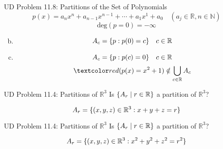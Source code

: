 \begin{frame}{}
  \begin{exampleblock}{UD Problem 11.8: Partitions of the Set of Polynomials}
    \[
      p(x) = a_n x^n + a_{n-1} x^{n-1} + \cdots + a_1 x^1 + a_0 \quad (a_j \in \mathbb{R}, n \in \mathbb{N})
    \]
    \[
      \text{deg}(p = 0) = -\infty
    \]

    \begin{enumerate}[(a)]
      \setcounter{enumi}{1}
      \item 
	\[
	  A_c = \{p: p(0) = c\} \quad c \in \mathbb{R}
	\]
      \setcounter{enumi}{3}
      \item 
	\pause
	\[
	  A_c = \{p: p(c) = 0\} \quad c \in \mathbb{R}
	\]
	\pause
	\vspace{-0.20cm}
	\[
	  \red{(p(x) = x^2 + 1) \notin \bigcup\limits_{c \in \mathbb{R}} A_c}
	\]
    \end{enumerate}
  \end{exampleblock}
\end{frame}

\begin{frame}{}
  \begin{exampleblock}{UD Problem 11.4: Partitions of $\mathbb{R}^{3}$}
    Is $\{A_r \mid r \in \mathbb{R}\}$ a partition of $\mathbb{R}^{3}$?

    \[
      A_{r} = \{(x,y,z) \in \mathbb{R}^{3}: x + y + z = r\}
    \]
  \end{exampleblock}

  \pause
\end{frame}

\begin{frame}{}
  \begin{exampleblock}{UD Problem 11.4: Partitions of $\mathbb{R}^{3}$}
    Is $\{A_r \mid r \in \mathbb{R}\}$ a partition of $\mathbb{R}^{3}$?

    \[
      A_{r} = \{(x,y,z) \in \mathbb{R}^{3}: x^2 + y^2 + z^2 = r^2\}
    \]
  \end{exampleblock}

  \pause
\end{frame}

